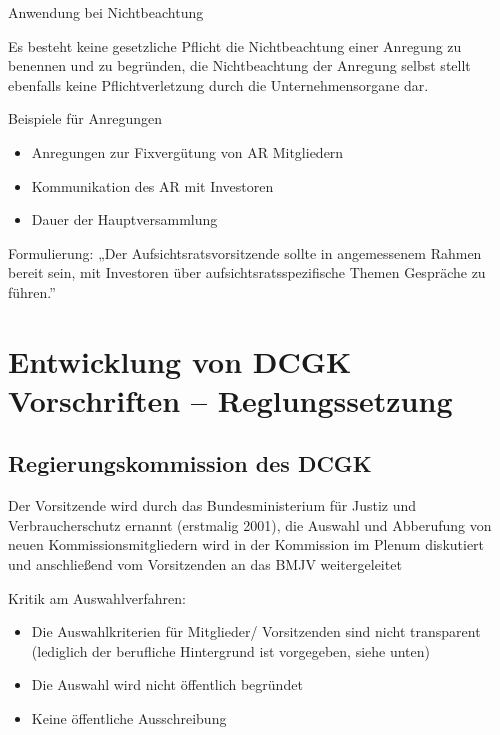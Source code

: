 \documentclass[
]{article}
\providecommand{\tightlist}{%
  \setlength{\itemsep}{0pt}\setlength{\parskip}{0pt}}
\begin{document}
Anwendung bei Nichtbeachtung

Es besteht keine gesetzliche Pflicht die Nichtbeachtung einer Anregung
zu benennen und zu begründen, die Nichtbeachtung der Anregung selbst
stellt ebenfalls keine Pflichtverletzung durch die Unternehmensorgane
dar.

Beispiele für Anregungen

\begin{itemize}
\tightlist
\item
  Anregungen zur Fixvergütung von AR Mitgliedern
\item
  Kommunikation des AR mit Investoren
\item
  Dauer der Hauptversammlung
\end{itemize}

Formulierung: „Der Aufsichtsratsvorsitzende sollte in angemessenem
Rahmen bereit sein, mit Investoren über aufsichtsratsspezifische Themen
Gespräche zu führen.''

\hypertarget{entwicklung-von-dcgk-vorschriften-reglungssetzung}{%
\section{Entwicklung von DCGK Vorschriften --
Reglungssetzung}\label{entwicklung-von-dcgk-vorschriften-reglungssetzung}}

\hypertarget{regierungskommission-des-dcgk}{%
\subsection{Regierungskommission des
DCGK}\label{regierungskommission-des-dcgk}}

Der Vorsitzende wird durch das Bundesministerium für Justiz und
Verbraucherschutz ernannt (erstmalig 2001), die Auswahl und Abberufung
von neuen Kommissionsmitgliedern wird in der Kommission im Plenum
diskutiert und anschließend vom Vorsitzenden an das BMJV weitergeleitet

Kritik am Auswahlverfahren:

\begin{itemize}
\tightlist
\item
  Die Auswahlkriterien für Mitglieder/ Vorsitzenden sind nicht
  transparent (lediglich der berufliche Hintergrund ist vorgegeben,
  siehe unten)
\item
  Die Auswahl wird nicht öffentlich begründet
\item
  Keine öffentliche Ausschreibung
\end{itemize}
\end{document}
